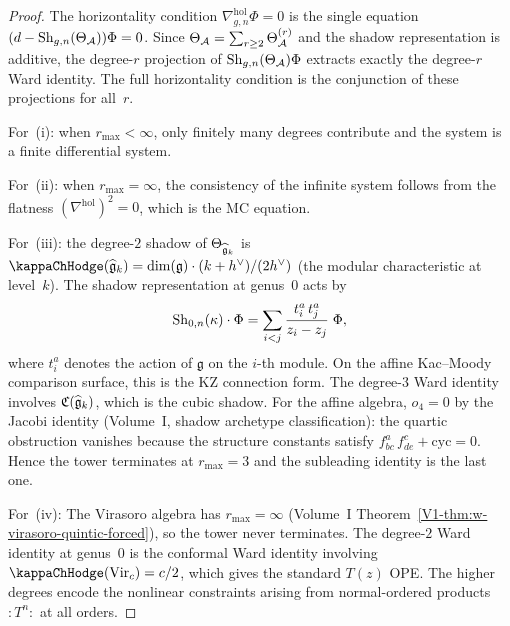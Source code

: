 \begin{proof}
The horizontality condition $\nabla^{\mathrm{hol}}_{g,n}\Phi = 0$
is the single equation $(d - \operatorname{Sh}_{g,n}(\Theta_{\mathcal{A}}))\Phi = 0$.
Since $\Theta_{\mathcal{A}} = \sum_{r \geq 2} \Theta_{\mathcal{A}}^{(r)}$ and the
shadow representation is additive, the degree-$r$ projection of
$\operatorname{Sh}_{g,n}(\Theta_{\mathcal{A}})\Phi$ extracts exactly the degree-$r$ Ward
identity. The full horizontality condition is the conjunction of
these projections for all~$r$.

For~(i): when $r_{\max} < \infty$, only finitely many degrees
contribute and the system is a finite differential system.

For~(ii): when $r_{\max} = \infty$, the consistency of the
infinite system follows from the flatness
$(\nabla^{\mathrm{hol}})^2 = 0$, which is the MC equation.

For~(iii): the degree-$2$ shadow of $\Theta_{\widehat{\mathfrak{g}}_k}$ is
$\kappaChHodge(\widehat{\fg}_k) = \dim(\fg)\cdot(k+h^\vee)/(2h^\vee)$ (the modular characteristic at
level~$k$). The shadow representation at genus~$0$ acts by
\begin{equation}%
\Sh_{0,n}(\kappa) \cdot \Phi
= \sum_{i < j} \frac{t^a_i\,t^a_j}{z_i - z_j}\;\Phi,
\end{equation}
where $t^a_i$ denotes the action of $\mathfrak{g}$ on the
$i$-th module. On the affine Kac--Moody comparison surface, this
is the KZ connection form. The degree-$3$
Ward identity involves $\mathfrak{C}(\widehat{\mathfrak{g}}_k)$, which
is the cubic shadow. For the affine algebra, $o_4 = 0$ by the
Jacobi identity
(Volume~I, shadow archetype classification): the quartic obstruction
vanishes because the structure constants satisfy
$f^a_{bc}\,f^c_{de} + \text{cyc} = 0$. Hence the tower terminates
at $r_{\max} = 3$ and the subleading identity is the last one.

For~(iv): The Virasoro algebra has $r_{\max} = \infty$
(Volume~I Theorem~\ref{V1-thm:w-virasoro-quintic-forced}), so the tower
never terminates. The degree-$2$ Ward identity at genus~$0$
is the conformal Ward identity involving
$\kappaChHodge(\mathrm{Vir}_c) = c/2$,
which gives the standard $T(z)$ OPE. The higher degrees encode the
nonlinear constraints arising from normal-ordered products
$:T^n:$ at all orders.
\end{proof}

